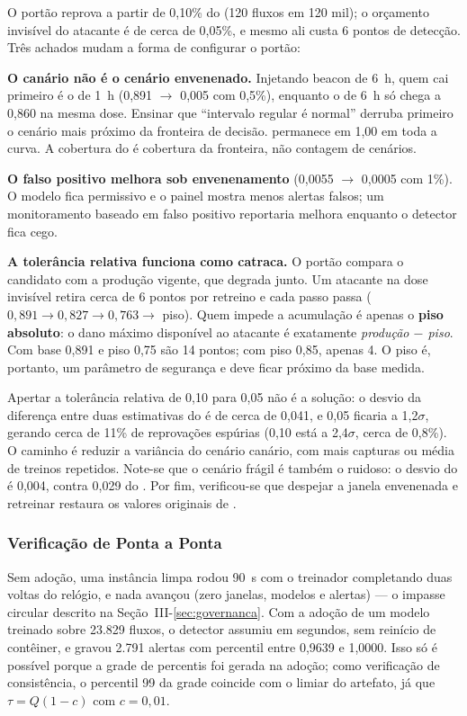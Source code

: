 O portão reprova a partir de 0,10\% do  (120 fluxos em 120 mil); o
orçamento invisível do atacante é de cerca de 0,05\%, e mesmo ali custa 6 pontos de
detecção. Três achados mudam a forma de configurar o portão:

\textbf{O canário não é o cenário envenenado.} Injetando beacon de 6~h, quem cai
primeiro é o de 1~h (0,891 $\to$ 0,005 com 0,5\%), enquanto o de 6~h só chega a 0,860
na mesma dose. Ensinar que “intervalo regular é normal” derruba primeiro o cenário
mais próximo da fronteira de decisão.  permanece em 1,00 em toda a
curva. A cobertura do  é cobertura da fronteira, não contagem de
cenários.

\textbf{O falso positivo melhora sob envenenamento} (0,0055 $\to$ 0,0005 com 1\%).
O modelo fica permissivo e o painel mostra menos alertas falsos; um monitoramento
baseado em falso positivo reportaria melhora enquanto o detector fica cego.

\textbf{A tolerância relativa funciona como catraca.} O portão compara o
candidato com a produção vigente, que degrada junto. Um atacante na dose invisível
retira cerca de 6 pontos por retreino e cada passo passa ($0{,}891 \to 0{,}827 \to
0{,}763 \to$ piso). Quem impede a acumulação é apenas o \textbf{piso absoluto}: o
dano máximo disponível ao atacante é exatamente \emph{produção $-$ piso}. Com base
0,891 e piso 0,75 são 14 pontos; com piso 0,85, apenas 4. O piso é, portanto, um
parâmetro de segurança e deve ficar próximo da base medida.

Apertar a tolerância relativa de 0,10 para 0,05 não é a solução: o desvio da
diferença entre duas estimativas do  é de cerca de 0,041, e 0,05
ficaria a 1,2$\sigma$, gerando cerca de 11\% de reprovações espúrias (0,10 está a
2,4$\sigma$, cerca de 0,8\%). O caminho é reduzir a variância do cenário canário,
com mais capturas ou média de treinos repetidos. Note-se que o cenário frágil é
também o ruidoso: o desvio do  é 0,004, contra 0,029 do
. Por fim, verificou-se que despejar a janela envenenada e retreinar
restaura os valores originais de .

\subsubsection{Verificação de Ponta a Ponta}

Sem adoção, uma instância limpa rodou 90~s com o treinador completando duas voltas
do relógio, e nada avançou (zero janelas, modelos e alertas) --- o impasse circular
descrito na Seção~III-\ref{sec:governanca}. Com a adoção de um modelo treinado sobre 23.829 fluxos, o
detector assumiu em segundos, sem reinício de contêiner, e gravou 2.791 alertas
com percentil entre 0,9639 e 1,0000. Isso só é possível porque a grade de percentis
foi gerada na adoção; como verificação de consistência, o percentil 99 da grade
coincide com o limiar do artefato, já que $\tau = Q(1-c)$ com $c = 0{,}01$.


